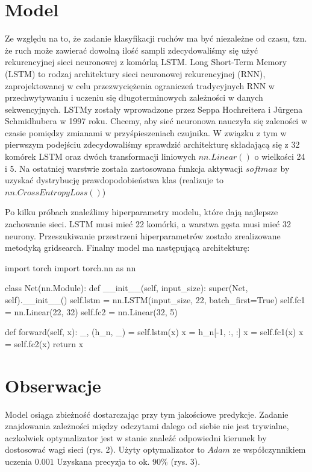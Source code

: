 \documentclass[10pt]{article}
\begin{document}
\section{Model}

Ze względu na to, że zadanie klasyfikacji ruchów ma być niezależne od czasu, tzn. że ruch może zawierać dowolną ilość sampli zdecydowaliśmy się użyć rekurencyjnej sieci neuronowej z komórką LSTM.
Long Short-Term Memory (LSTM) to rodzaj architektury sieci neuronowej rekurencyjnej (RNN), zaprojektowanej w celu przezwyciężenia ograniczeń tradycyjnych RNN w przechwytywaniu i uczeniu się długoterminowych zależności w danych sekwencyjnych. LSTMy zostały wprowadzone przez Seppa Hochreitera i Jürgena Schmidhubera w 1997 roku. Chcemy, aby sieć neuronowa nauczyła się zaleności w czasie pomiędzy zmianami w przyśpieszeniach czujnika. W związku z tym w pierwszym podejściu zdecydowaliśmy sprawdzić architekturę składającą się z 32 komórek LSTM oraz dwóch transformacji liniowych $nn.Linear()$ o wielkości 24 i 5. Na ostatniej warstwie została zastosowana funkcja aktywacji $softmax$ by uzyskać dystrybucję prawdopodobieństwa klas (realizuje to $nn.CrossEntropyLoss()$)


Po kilku próbach znaleźlimy hiperparametry modelu, które dają najlepsze zachowanie sieci. LSTM musi mieć 22 komórki, a warstwa gęsta musi mieć 32 neurony. Przeszukiwanie przestrzeni hiperparametrów zostało zrealizowane metodyką gridsearch. Finalny model ma następującą architekturę:

\begin{python}
import torch
import torch.nn as nn

class Net(nn.Module):
  def __init__(self, input_size):
      super(Net, self).__init__()
      self.lstm = nn.LSTM(input_size, 22, batch_first=True)
      self.fc1 = nn.Linear(22, 32)
      self.fc2 = nn.Linear(32, 5)

  def forward(self, x):
      _, (h_n, _) = self.lstm(x)
      x = h_n[-1, :, :]
      x = self.fc1(x)
      x = self.fc2(x)
      return x
\end{python}


\section{Obserwacje}

Model osiąga zbieżność dostarczając przy tym jakościowe predykcje. Zadanie znajdowania zależności między odczytami dalego od siebie nie jest trywialne, aczkolwiek optymalizator jest w stanie znaleźć odpowiedni kierunek by dostosować wagi sieci (rys. 2).
Użyty optymalizator to $Adam$ ze współczynnikiem uczenia $0.001$
 Uzyskana precyzja to ok. 90\% (rys. 3). 
\end{document}
